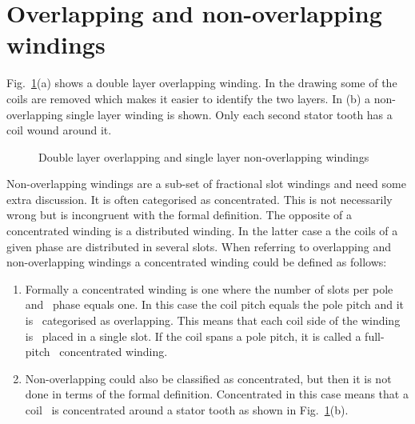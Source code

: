 \section{Overlapping and non-overlapping windings}\label{sec:def_con}  
Fig.~\ref{fig:flux_coils}(a) shows a double layer overlapping winding. In the drawing some of the coils are removed which makes it easier to identify the two layers. In (b) a non-overlapping single layer winding is shown. Only each second stator tooth has a coil wound around it. 
\begin{figure}[htbp]
	\centering
		
	\caption{Double layer overlapping and single layer non-overlapping windings}
	\label{fig:flux_coils}
\end{figure}

Non-overlapping windings are a sub-set of fractional slot windings and need some extra discussion. It is often categorised as concentrated. This is not necessarily wrong but is incongruent with the formal definition. The opposite of a concentrated winding is a distributed winding. In the latter case a the coils of a given phase are distributed in several slots. When referring to overlapping and non-overlapping windings a concentrated winding could be defined as follows:
\begin{enumerate}
	\item Formally a concentrated winding is one where the number of slots per pole and~%
	phase equals one. In this case the coil pitch equals the pole pitch and it is~%
	categorised as overlapping. This means that each coil side of the winding is~%
	placed in a single slot. If the coil spans a pole pitch, it is called a full-pitch~%
	concentrated winding.
	\item Non-overlapping could also be classified as concentrated, but then it is not~%
	done in terms of the formal definition. Concentrated in this case means that a coil~%
	is concentrated around a stator tooth as shown in Fig.~\ref{fig:flux_coils}(b).
\end{enumerate}

